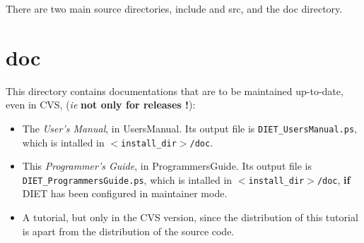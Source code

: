 

There are two main source directories, \textsf{include} and \textsf{src}, and
the \textsf{doc} directory.


\section{\textsf{doc}}
\label{s:doc}

This directory contains documentations that are to be maintained up-to-date,
even in CVS, (\emph{ie} \textbf{not only for releases !}):

\begin{itemize}
\item The \textit{User's Manual}, in \textsf{UsersManual}. Its output file is
  \texttt{DIET\_UsersManual.ps}, which is intalled in
  \texttt{$<$install\_dir$>$/doc}.
\item This \textit{Programmer's Guide}, in \textsf{ProgrammersGuide}. Its output
  file is \texttt{DIET\_ProgrammersGuide.ps}, which is intalled in
  \texttt{$<$install\_dir$>$/doc}, \textbf{if} DIET has been configured in
  maintainer mode.
\item A tutorial, but only in the CVS version, since the distribution of this
  tutorial is apart from the distribution of the source code.
\end{itemize}

